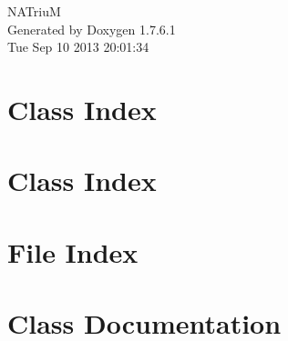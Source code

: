 \documentclass[a4paper]{book}
\begin{document}
\hypersetup{pageanchor=false,citecolor=blue}
\begin{titlepage}
\vspace*{7cm}
\begin{center}
{\Large \-N\-A\-Triu\-M }\\
\vspace*{1cm}
{\large \-Generated by Doxygen 1.7.6.1}\\
\vspace*{0.5cm}
{\small Tue Sep 10 2013 20:01:34}\\
\end{center}
\end{titlepage}
\clearemptydoublepage
{}
\tableofcontents
\clearemptydoublepage
{}
\hypersetup{pageanchor=true,citecolor=blue}
\chapter{\-Class \-Index}

\chapter{\-Class \-Index}

\chapter{\-File \-Index}

\chapter{\-Class \-Documentation}
















\end{document}

